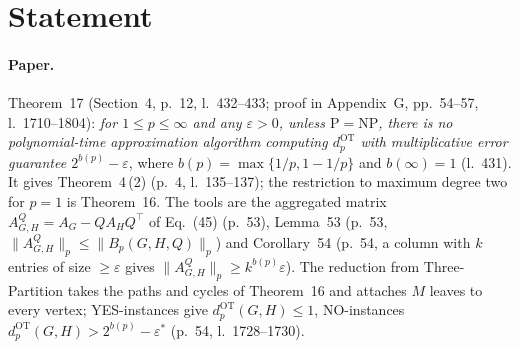 

\paperversion

\section{Statement}

\paragraph{Paper.} Theorem~17 (Section~4, p.~12, l.~432--433; proof in Appendix~G, pp.~54--57,
l.~1710--1804): \emph{for $1\le p\le\infty$ and any $\varepsilon>0$, unless $\mathrm{P}=\mathrm{NP}$, there
is no polynomial-time approximation algorithm computing $d^{\mathrm{OT}}_p$ with multiplicative error
guarantee $2^{b(p)}-\varepsilon$}, where $b(p)=\max\{1/p,1-1/p\}$ and $b(\infty)=1$ (l.~431). It gives
Theorem~4\,(2) (p.~4, l.~135--137); the restriction to maximum degree two for $p=1$ is Theorem~16. The tools
are the aggregated matrix $A^Q_{G,H}=A_G-QA_HQ^\top$ of Eq.~(45) (p.~53),
Lemma~53 (p.~53, $\|A^Q_{G,H}\|_p\le\|B_p(G,H,Q)\|_p$) and Corollary~54 (p.~54, a column with $k$ entries
of size $\ge\varepsilon$ gives $\|A^Q_{G,H}\|_p\ge k^{b(p)}\varepsilon$). The reduction from Three-Partition
takes the paths and cycles of Theorem~16 and attaches $M$ leaves to every vertex; YES-instances give
$d^{\mathrm{OT}}_p(G,H)\le1$, NO-instances $d^{\mathrm{OT}}_p(G,H)>2^{b(p)}-\varepsilon^*$ (p.~54, l.~1728--1730).

